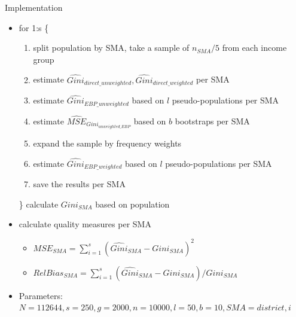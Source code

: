 \documentclass[fleqn,final]{beamer}
\newcommand{\Pheight}{\rule[-5mm]{0cm}{1cm}}
\begin{document}
\begin{frame}
\begin{columns}[t]
\begin{column}{.3\linewidth}
\begin{block}{Implementation \Pheight}
\begin{itemize}
\item for 1:s \{
\begin{enumerate}  %
\item split population by SMA, take a sample of $n_{SMA} / 5$ from each income group
\item estimate $\widehat{Gini}_{direct\_unweighted}, \widehat{Gini}_{direct\_weighted}$ per SMA
\item estimate $\widehat{Gini}_{EBP\_unweighted}$  based on $l$ pseudo-populations per SMA
\item estimate $\widehat{MSE}_{Gini_{unweighted\_EBP}}$ based on $b$ bootstraps per SMA
\item expand the sample by frequency weights
\item estimate $\widehat{Gini}_{EBP\_weighted}$  based on $l$ pseudo-populations per SMA
\item save the results per SMA
\end{enumerate}
\}
calculate $Gini_{SMA}$ based on population
 
\item calculate quality measures per SMA
	\begin{itemize}
		\item $MSE_{SMA} = \sum_{i = 1}^{s} (\widehat{Gini}_{SMA} - Gini_{SMA})^2$
		\item $RelBias_{SMA} = \sum_{i = 1}^{s} (\widehat{Gini}_{SMA} - Gini_{SMA})/Gini_{SMA}$
	\end{itemize}
\item Parameters: $N=112644, s=250, g=2000, n=10000, l=50, b=10, SMA=district, i=5$
\end{itemize}
\end{block}



 
\end{column}

%


\begin{column}{.3\linewidth}


\end{column}
\end{columns}
\end{frame}
\end{document}
